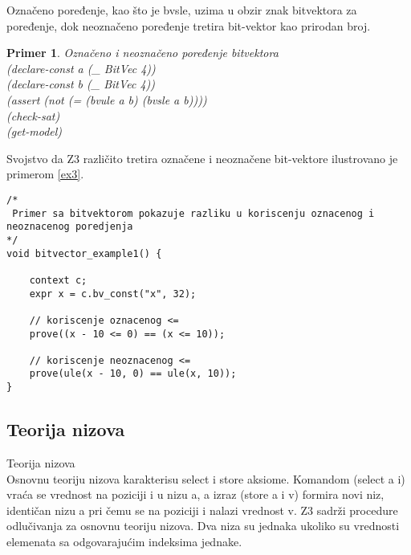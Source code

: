 \documentclass[12pt,oneside]{memoir}
\newtheorem{primer}{Primer}
\begin{document}
Označeno poređenje, kao što je bvsle, uzima u obzir znak bitvektora za poređenje, dok neoznačeno poređenje tretira bit-vektor kao prirodan broj.
\\
\begin{primer} Označeno i neoznačeno poređenje bitvektora
\\(declare-const a (\_ BitVec 4))
\\(declare-const b (\_ BitVec 4))
\\(assert (not (= (bvule a b) (bvsle a b))))
\\(check-sat)
\\(get-model)
\end{primer}
Svojstvo da Z3 različito tretira označene i neoznačene bit-vektore ilustrovano je  primerom \ref{ex3}.
\\ 
\begin{lstlisting}
/*
 Primer sa bitvektorom pokazuje razliku u koriscenju oznacenog i neoznacenog poredjenja
*/
void bitvector_example1() {

    context c;
    expr x = c.bv_const("x", 32);
    
    // koriscenje oznacenog <=
    prove((x - 10 <= 0) == (x <= 10));

    // koriscenje neoznacenog <=
    prove(ule(x - 10, 0) == ule(x, 10));
}

\end{lstlisting}

\subsection{Teorija nizova}
Teorija nizova\\
Osnovnu teoriju nizova karakterisu select i store aksiome. 
Komandom (select a i) vraća se vrednost na poziciji i u nizu a, a izraz (store a i v) formira novi niz, identičan nizu a pri čemu se na poziciji i nalazi vrednost v.
Z3 sadrži procedure odlučivanja za osnovnu teoriju nizova.
Dva niza su jednaka ukoliko su vrednosti elemenata sa odgovarajućim indeksima jednake.
\\
\end{document}
